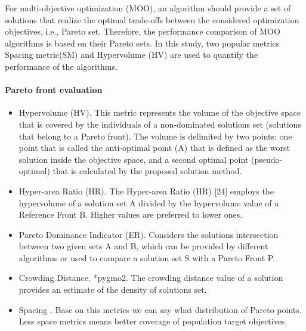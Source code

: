             For multi-objective optimization (MOO), an algorithm
            should provide a set of solutions that realize the optimal trade-offs between the considered optimization objectives, 
            i.e., Pareto set. Therefore, the performance comparison of MOO algorithms is based on their Pareto sets.
            In this study, two popular metrics Spacing metric(SM) and Hypervolume (HV) are used to quantify the performance of the algorithms. \cite{DBLP:journals/corr/abs-1812-07958}
           

            \paragraph{Pareto front evaluation}
            \begin{itemize}
                \item Hypervolume (HV)\cite{Zitzler2000ComparisonOM}. 
                This metric represents the volume of the objective space
                that is covered by the individuals of a non-dominated
                solutions set (solutions that belong to a Pareto front). The
                volume is delimited by two points: one point that is called
                the anti-optimal point (A) that is defined as the worst
                solution inside the objective space, and a second optimal
                point (pseudo-optimal) that is calculated by the proposed
                solution method. 
                \item Hyper-area Ratio (HR).
                The Hyper-area Ratio (HR) [24] employs the hypervolume of a solution set A
                divided by the hypervolume value of a Reference Front B. Higher values are
                preferred to lower ones.
                \item Pareto Dominance Indicator (ER). 
                Considers the solutions intersection between two given sets A and B, which can be 
                provided by different algorithms or used to compare a solution set S with a Pareto Front P.
                \item Crowding Distance. *pygmo2. The crowding distance value of a solution provides an estimate of the density of solutions set.
                \item Spacing \cite{Schott1995FaultTD}. Base on this metrics we can say what distribution of Pareto points. Less space metrics means better coverage of population target objectives.
                
            \end{itemize}
        
